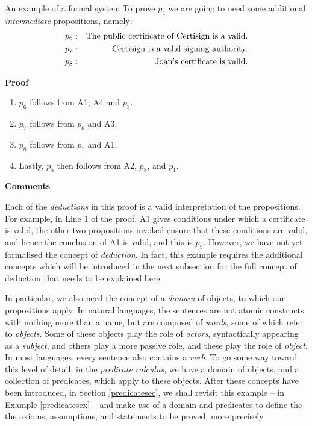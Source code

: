 \begin{example}{An example of a formal system}
To prove $p_4$ we are going to need some additional {\em intermediate} propositions, namely:
\begin{eqnarray}
		p_6:&&\hbox{The public certificate of Certisign is a valid.}\nonumber\label{v1}\\
		p_7:&&\hbox{Certisign is a valid signing authority.}\nonumber\label{v1}\\
		p_8:&&\hbox{Joan's certificate is valid.}\nonumber\label{v1}
\end{eqnarray}

{\bf Proof}
\begin{enumerate}[1.]
\item $p_6$ follows from A1, A4 and $p_3$. 

\item $p_7$ follows from $p_6$ and A3. 

\item $p_8$ follows from $p_7$ and A1. 

\item Lastly, $p_5$ then follows from A2, $p_8$, and $p_1$.
\end{enumerate}

{\bf Comments}

Each of the {\em deductions} in this proof is a valid interpretation of the propositions. For example,
in Line 1 of the proof,
A1 gives conditions under which a certificate is valid, the other two propositions invoked ensure
that these conditions are valid, and hence the conclusion of A1 is valid, and this is $p_5$. However,
we have not yet formalised the concept of {\em deduction}. In fact, this example requires the additional
concepts which will be introduced in the next subsection for the full concept of deduction
that needs to be explained here.

In particular, we also need the concept of a {\em domain} of objects, to which our propositions
apply. In natural languages, the sentences are not atomic constructs with nothing more than a name, but
are composed of {\em words}, some of which refer to {\em objects}. Some of these objects play the role of
{\em actors}, syntactically appearing as a {\em subject}, and others play a more passive role, and these
play the role of {\em object}. In most languages, every sentence also contains a {\em verb}. To
go some way toward this level of detail, in the {\em predicate calculus}, we have a domain
of objects, and a collection of predicates, which apply to these objects. After these concepts
have been introduced, in Section \ref{predicatesec}, we shall revisit this example 
-- in Example \ref{predicatesex} -- and make use of a domain
and predicates to define the the axioms, assumptions, and statements to be proved, more precisely.

\end{example}

